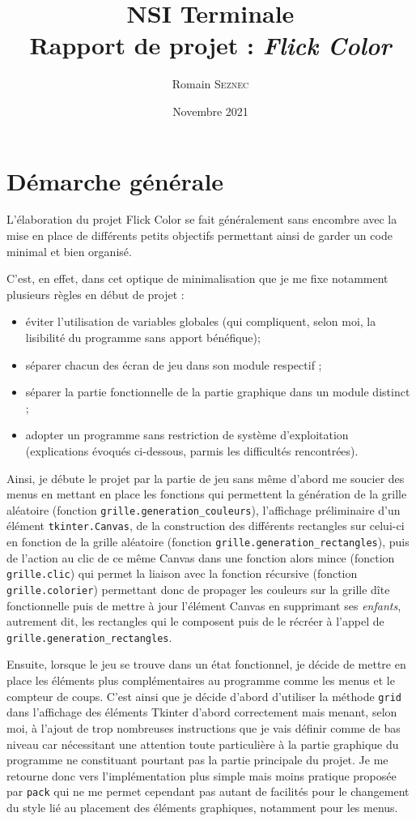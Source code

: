 \documentclass[a4]{article}
\title{NSI Terminale\\Rapport de projet : \textit{Flick Color}}
\author{Romain \textsc{Seznec}}
\date{Novembre 2021}
\begin{document}
\maketitle

\section{Démarche générale}

L'élaboration du projet Flick Color se fait généralement sans encombre avec la mise en place de différents petits objectifs permettant ainsi de garder un code minimal et bien organisé.

C'est, en effet, dans cet optique de minimalisation que je me fixe notamment plusieurs règles en début de projet :

\begin{itemize}
	\item éviter l'utilisation de variables globales (qui compliquent, selon moi, la lisibilité du programme sans apport bénéfique);
	\item séparer chacun des écran de jeu dans son module respectif ;
	\item séparer la partie fonctionnelle de la partie graphique dans un module distinct ;
	\item adopter un programme sans restriction de système d'exploitation (explications évoqués ci-dessous, parmis les difficultés rencontrées).
\end{itemize}

Ainsi, je débute le projet par la partie de jeu sans même d'abord me soucier des menus en mettant en place les fonctions qui permettent la génération de la grille aléatoire (fonction \texttt{grille.generation\_couleurs}), l'affichage préliminaire d'un élément \texttt{tkinter.Canvas}, de la construction des différents rectangles sur celui-ci en fonction de la grille aléatoire (fonction \texttt{grille.generation\_rectangles}), puis de l'action au clic de ce même Canvas dans une fonction alors mince (fonction \texttt{grille.clic}) qui permet la liaison avec la fonction récursive (fonction \texttt{grille.colorier}) permettant donc de propager les couleurs sur la grille dîte fonctionnelle puis de mettre à jour l'élément Canvas en supprimant ses \textit{enfants}, autrement dit, les rectangles qui le composent puis de le récréer à l'appel de \texttt{grille.generation\_rectangles}.

Ensuite, lorsque le jeu se trouve dans un état fonctionnel, je décide de mettre en place les éléments plus complémentaires au programme comme les menus et le compteur de coups. C'est ainsi que je décide d'abord d'utiliser la méthode \texttt{grid} dans l'affichage des éléments Tkinter d'abord correctement mais menant, selon moi, à l'ajout de trop nombreuses instructions que je vais définir comme de bas niveau car nécessitant une attention toute particulière à la partie graphique du programme ne constituant pourtant pas la partie principale du projet. Je me retourne donc vers l'implémentation plus simple mais moins pratique proposée par \texttt{pack} qui ne me permet cependant pas autant de facilités pour le changement du style lié au placement des éléments graphiques, notamment pour les menus.
\end{document}
